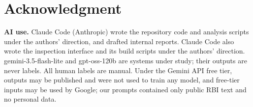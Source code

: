 \documentclass[conference]{IEEEtran}
\begin{document}
\section*{Acknowledgment}
\textbf{AI use.} Claude Code (Anthropic) wrote the repository code and analysis scripts under the authors' direction, and drafted
internal reports. Claude Code also wrote the inspection interface and its build scripts under the authors' direction. gemini-3.5-flash-lite and gpt-oss-120b are systems under study; their outputs are never labels. All human labels
are manual. Under the Gemini API free tier, outputs may be published and were not used to train any model, and free-tier inputs may
be used by Google; our prompts contained only public RBI text and no personal data.



\end{document}
